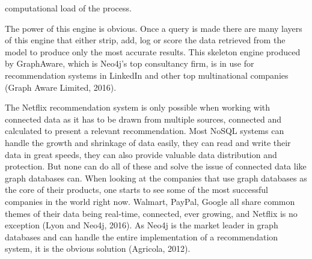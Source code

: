 \documentclass[a4paper]{article}
\begin{document}
computational load of the process.

The power of this engine is obvious. Once a query is made there are many layers of this engine that either strip, add, log or score the data retrieved from the model to produce only the most accurate results. This skeleton engine produced by GraphAware, which is Neo4j's top consultancy firm, is in use for recommendation systems in LinkedIn and other top multinational companies (Graph Aware Limited, 2016).

The Netflix recommendation system is only possible when working with connected data as it has to be drawn from multiple sources, connected and calculated to present a relevant recommendation. Most NoSQL systems can handle the growth and shrinkage of data easily, they can read and write their data in great speeds, they can also provide valuable data distribution and protection. But none can do all of these and solve the issue of connected data like graph databases can. When looking at the companies that use graph databases as the core of their products, one starts to see some of the most successful companies in the world right now. Walmart, PayPal, Google all share common themes of their data being real-time, connected, ever growing, and Netflix is no exception (Lyon and Neo4j, 2016). As Neo4j is the market leader in graph databases and can handle the entire implementation of a recommendation system, it is the obvious solution (Agricola, 2012). \par
\end{document}
